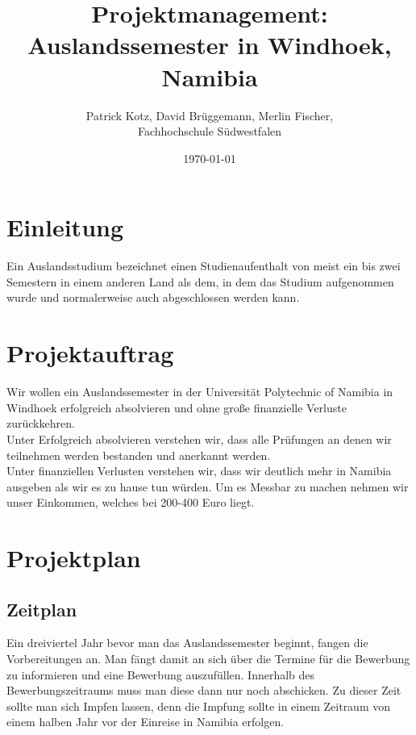 \documentclass[11pt]{article}
\begin{document}
\begin{titlepage}
  \title{Projektmanagement: \\Auslandssemester in Windhoek, Namibia}
  \author{Patrick Kotz, David Brüggemann, Merlin Fischer,\\ Fachhochschule Südwestfalen}
  \date{\today}
\end{titlepage}

\fancyfoot[C]{\thepage}

\maketitle

\newpage
\tableofcontents
\newpage

\section{Einleitung}
Ein Auslandsstudium bezeichnet einen Studienaufenthalt von meist ein bis zwei Semestern in einem anderen Land als dem, in dem das Studium aufgenommen wurde und normalerweise auch abgeschlossen werden kann.

\section{Projektauftrag}
Wir wollen ein Auslandssemester in der Universität Polytechnic of Namibia in Windhoek erfolgreich absolvieren und ohne große finanzielle Verluste zurückkehren.\\

Unter Erfolgreich absolvieren verstehen wir, dass alle Prüfungen an denen wir teilnehmen werden bestanden und anerkannt werden.\\

Unter finanziellen Verlusten verstehen wir, dass wir deutlich mehr in Namibia ausgeben als wir es zu hause tun würden. Um es Messbar zu machen nehmen wir unser Einkommen, welches bei 200-400 Euro liegt.

\newpage

\section{Projektplan}

\subsection{Zeitplan}
Ein dreiviertel Jahr bevor man das Auslandssemester beginnt, fangen die Vorbereitungen an. Man fängt damit an sich über die Termine für die Bewerbung zu informieren und eine Bewerbung auszufüllen. Innerhalb des Bewerbungszeitraums muss man diese dann nur noch abschicken. Zu dieser Zeit sollte man sich Impfen lassen, denn die Impfung sollte in einem Zeitraum von einem halben Jahr vor der Einreise in Namibia erfolgen. 
\end{document}
